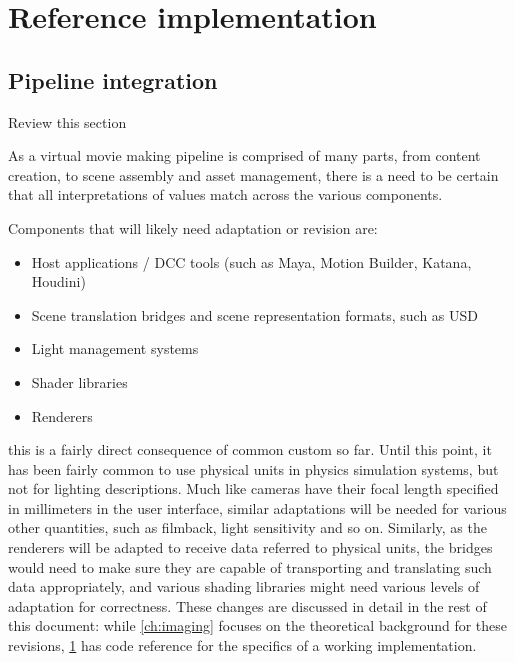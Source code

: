 
\chapter{Reference implementation}\label{ch:implementation}

\section{Pipeline integration}

\begin{inconstruction}
	Review this section
\end{inconstruction}

As a virtual movie making pipeline is comprised of many parts, from content creation, to
scene assembly and asset management, there is a need to
be certain that all interpretations of values match across the various components.

Components that will likely need adaptation or revision are:

\begin{itemize}
	\item Host applications / \gls{DCC} tools (such as Maya, Motion Builder, Katana, Houdini)
	\item Scene translation bridges and scene representation formats, such as \gls{USD}
	\item Light management systems
	\item Shader libraries
	\item Renderers
\end{itemize}
this is a fairly direct consequence of common custom so far. Until this point, it has been
fairly common to use physical units in physics simulation systems, 
but not for lighting descriptions.
Much like cameras have their focal length specified in millimeters in the user interface,
similar adaptations will be needed for various other quantities, such as filmback, light 
sensitivity and so on. Similarly, as the renderers will be adapted to receive data
referred to physical units, the bridges would need to make sure they are capable of transporting
and translating such data appropriately, and various shading libraries might need various levels
of adaptation for correctness. These changes are discussed in detail in the rest of this document:
while \cref{ch:imaging} focuses on the theoretical background for these revisions,
\cref{ch:implementation} has code reference for the specifics of a working implementation.

